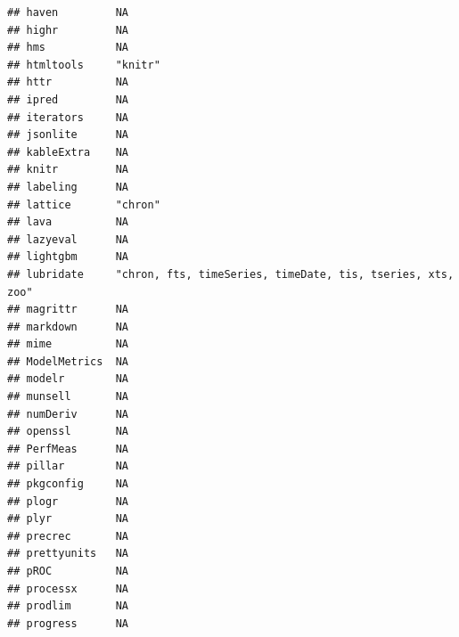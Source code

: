 \documentclass[]{article}
\begin{document}
\begin{verbatim}
## haven         NA                                                        
## highr         NA                                                        
## hms           NA                                                        
## htmltools     "knitr"                                                   
## httr          NA                                                        
## ipred         NA                                                        
## iterators     NA                                                        
## jsonlite      NA                                                        
## kableExtra    NA                                                        
## knitr         NA                                                        
## labeling      NA                                                        
## lattice       "chron"                                                   
## lava          NA                                                        
## lazyeval      NA                                                        
## lightgbm      NA                                                        
## lubridate     "chron, fts, timeSeries, timeDate, tis, tseries, xts, zoo"
## magrittr      NA                                                        
## markdown      NA                                                        
## mime          NA                                                        
## ModelMetrics  NA                                                        
## modelr        NA                                                        
## munsell       NA                                                        
## numDeriv      NA                                                        
## openssl       NA                                                        
## PerfMeas      NA                                                        
## pillar        NA                                                        
## pkgconfig     NA                                                        
## plogr         NA                                                        
## plyr          NA                                                        
## precrec       NA                                                        
## prettyunits   NA                                                        
## pROC          NA                                                        
## processx      NA                                                        
## prodlim       NA                                                        
## progress      NA                                                        

\end{verbatim}
\end{document}
